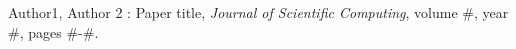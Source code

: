 Author1, Author 2 : Paper title, \textit{Journal of Scientific Computing}, volume \#, year \#, pages \#-\#.